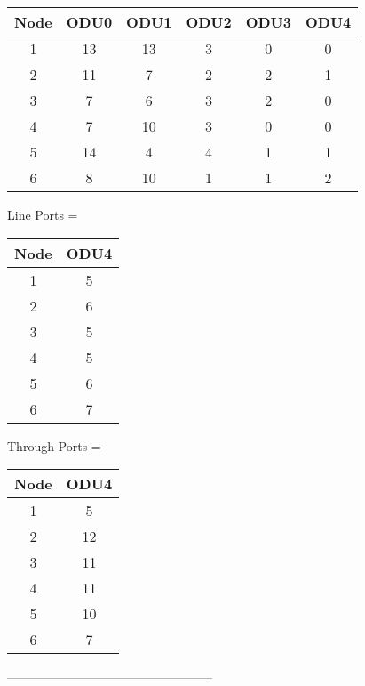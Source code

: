 \begin{tabular}{|c|c|c|c|c|c|}
  \hline
  Node & ODU0 & ODU1 & ODU2 & ODU3 & ODU4 \\
  \hline\hline
  1 & 13 & 13 & 3 & 0 & 0 \\
  2 & 11 & 7 & 2 & 2 & 1 \\
  3 & 7 & 6 & 3 & 2 & 0 \\
  4 & 7 & 10 & 3 & 0 & 0 \\
  5 & 14 & 4 & 4 & 1 & 1 \\
  6 & 8 & 10 & 1 & 1 & 2 \\
  \hline
\end{tabular}

\vspace{11pt}

Line Ports =\\


\begin{tabular}{|c|c|}
  \hline
  Node & ODU4 \\
  \hline\hline
  1 & 5 \\
  2 & 6 \\
  3 & 5 \\
  4 & 5 \\
  5 & 6 \\
  6 & 7 \\
  \hline
\end{tabular}

\vspace{11pt}

Through Ports = \\


\begin{tabular}{|c|c|}
  \hline
  Node & ODU4 \\
  \hline\hline
  1 & 5 \\
  2 & 12 \\
  3 & 11 \\
  4 & 11 \\
  5 & 10 \\
  6 & 7 \\
  \hline
\end{tabular}
   
-------------------------------------------------- \\

